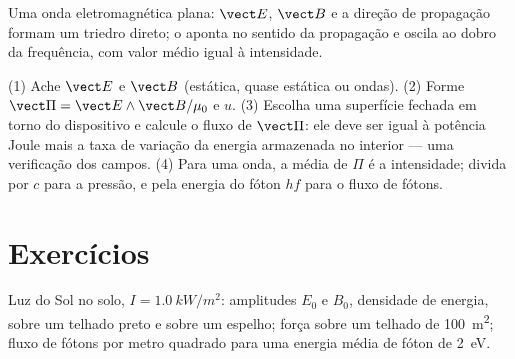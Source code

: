 \begin{omfigure}

{\small Uma onda eletromagnética plana: $\vect E$, $\vect B$ e a
direção de propagação formam um triedro direto; o  aponta no sentido da propagação e oscila ao dobro da
frequência, com valor médio igual à intensidade.}
\end{omfigure}

\begin{method}\label{met:b2:poynting-vector:method}
(1) Ache $\vect E$ e $\vect B$ (estática, quase estática ou ondas). (2)
Forme $\vect\Pi = \vect E\wedge\vect B/\mu_0$ e $u$. (3) Escolha uma superfície
fechada em torno do dispositivo e calcule o fluxo de $\vect\Pi$: ele deve
ser igual à potência Joule mais a taxa de variação da energia armazenada
no interior --- uma verificação dos campos. (4) Para uma onda, a média de $\Pi$ é
a intensidade; divida por $c$ para a pressão, e pela energia do fóton
$hf$ para o fluxo de fótons.
\end{method}

\section{Exercícios}

\begin{exercise}[$\star$]\label{exo:b2:poynting-vector:1}
Luz do Sol no solo, $I = \qty{1.0}{kW/m^2}$: amplitudes $E_0$ e $B_0$,
densidade de energia,  sobre um telhado preto e sobre um espelho;
força sobre um telhado de \qty{100}{m^2}; fluxo de fótons por metro quadrado para uma
energia média de fóton de \qty{2}{eV}.
\end{exercise}

